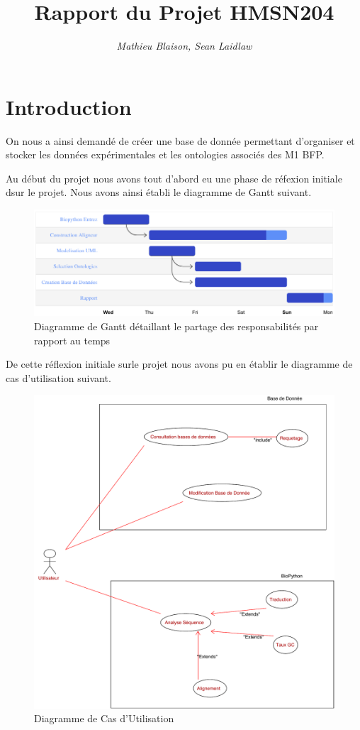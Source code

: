 \documentclass[11pt,french,]{article}
\title{Rapport du Projet HMSN204}
\author{\emph{Mathieu Blaison, Sean Laidlaw}}
\date{}
\begin{document}
\maketitle

\hypertarget{introduction}{%
\section{Introduction}\label{introduction}}

On nous a ainsi demandé de créer une base de donnée permettant
d'organiser et stocker les données expérimentales et les ontologies
associés des M1 BFP.

Au début du projet nous avons tout d'abord eu une phase de réfexion
initiale dsur le projet. Nous avons ainsi établi le diagramme de Gantt
suivant.

\begin{figure}[h]
 \centering
 \includegraphics{../img/gantt_2.png}
 \caption{Diagramme de Gantt détaillant le partage des responsabilités par rapport au temps}
\end{figure}

De cette réflexion initiale surle projet nous avons pu en établir le
diagramme de cas d'utilisation suivant.

\begin{figure}[H]
 \centering
 \includegraphics{../img/Cas_utilisation.pdf}
 \caption{Diagramme de Cas d'Utilisation}
\end{figure}
\end{document}
